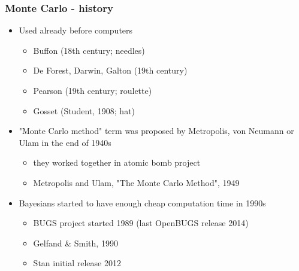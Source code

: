 \documentclass[10pt]{beamer}
\begin{document}
\begin{frame}
\frametitle{Monte Carlo - history}

  \begin{itemize}
  \item Used already before computers
    \begin{itemize}
      \item Buffon (18th century; needles)
      \item De Forest, Darwin, Galton (19th century)
      \item Pearson (19th century; roulette)
      \item Gosset (Student, 1908; hat)
    \end{itemize}
    \pause
  \item "Monte Carlo method" term was proposed by Metropolis, von Neumann
    or Ulam in the end of 1940s
     \begin{itemize}
     \item they worked together in atomic bomb project
     \item Metropolis and Ulam, "The Monte Carlo Method", 1949
     \end{itemize}
    \pause
   \item Bayesians started to have enough cheap computation time in 1990s
     \begin{itemize}
     \item BUGS project started 1989 (last OpenBUGS release 2014)
     \item Gelfand \& Smith, 1990
     \item Stan initial release 2012
     \end{itemize}
  \end{itemize}

\end{frame}
\end{document}
